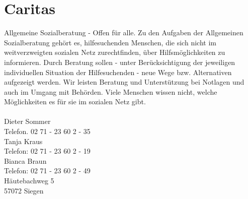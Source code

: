 \section{Caritas}
Allgemeine Sozialberatung - Offen für alle. Zu den Aufgaben der Allgemeinen Sozialberatung gehört es, hilfesuchenden Menschen, die sich nicht im weitverzweigten sozialen Netz zurechtfinden, über Hilfsmöglichkeiten zu informieren.  Durch Beratung sollen - unter Berücksichtigung der jeweiligen individuellen Situation der Hilfesuchenden - neue Wege bzw. Alternativen aufgezeigt werden. Wir leisten Beratung und Unterstützung bei Notlagen und auch im Umgang mit Behörden. Viele Menschen wissen nicht, welche Möglichkeiten es für sie im sozialen Netz gibt.\\
\\
Dieter Sommer \\
Telefon. 02 71 - 23 60 2 - 35\\ 
Tanja Kraus \\
Telefon: 02 71 - 23 60 2 - 19 \\
Bianca Braun \\
Telefon: 02 71 - 23 60 2 - 49\\  
Häutebachweg 5\\
57072 Siegen 